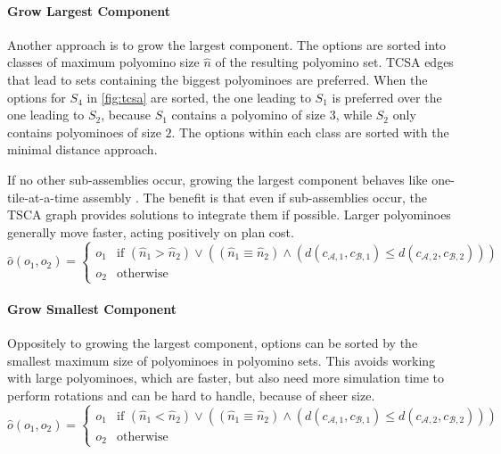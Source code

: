 \paragraph{Grow Largest Component}

Another approach is to grow the largest component.
The options are sorted into classes of maximum polyomino size $\hat{n}$ of the resulting polyomino set.
TCSA edges that lead to sets containing the biggest polyominoes are preferred.
When the options for $S_4$ in \autoref{fig:tcsa} are sorted, the one leading to $S_1$ is preferred over the one leading to $S_2$, because $S_1$ contains a polyomino of size $3$, while $S_2$ only contains polyominoes of size $2$. 
The options within each class are sorted with the minimal distance approach.

If no other sub-assemblies occur, growing the largest component behaves like one-tile-at-a-time assembly \cite{Becker2020}.
The benefit is that even if sub-assemblies occur, the TSCA graph provides solutions to integrate them if possible.
Larger polyominoes generally move faster, acting positively on plan cost.
\begin{equation}
\hat{o}(o_1, o_2) =
\begin{cases}
o_1 & \text{if } \left( \hat{n}_1 > \hat{n}_2 \right) \lor \left( \left( \hat{n}_1 \equiv \hat{n}_2 \right) \land \left( d(c_{\mathcal{A},1}, c_{\mathcal{B},1}) \leq d(c_{\mathcal{A},2}, c_{\mathcal{B},2})\right)\right) \\
o_2 & \text{otherwise}
\end{cases}
\end{equation}

\paragraph{Grow Smallest Component}

Oppositely to growing the largest component, options can be sorted by the smallest maximum size of polyominoes in polyomino sets.
This avoids working with large polyominoes, which are faster, but also need more simulation time to perform rotations and can be hard to handle, because of sheer size.
\begin{equation}
\hat{o}(o_1, o_2) =
\begin{cases}
o_1 & \text{if } \left( \hat{n}_1 < \hat{n}_2 \right) \lor \left( \left( \hat{n}_1 \equiv \hat{n}_2 \right) \land \left( d(c_{\mathcal{A},1}, c_{\mathcal{B},1}) \leq d(c_{\mathcal{A},2}, c_{\mathcal{B},2})\right)\right) \\
o_2 & \text{otherwise}
\end{cases}
\end{equation}

